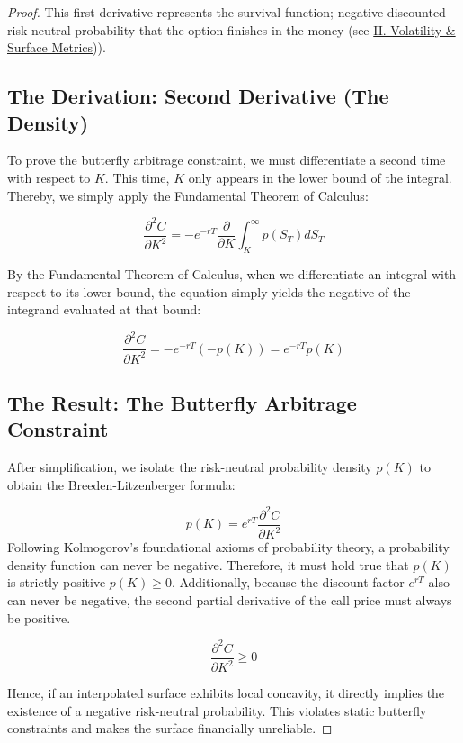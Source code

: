 \documentclass[12pt,oneside]{report}
\theoremstyle{definition}
\theoremstyle{remark}
\begin{document}
\begin{proof}
This first derivative represents the survival function; negative discounted risk-neutral probability that the option finishes in the money (see \hyperref[sec:glossary_volatility_surface_metrics]{II. Volatility \& Surface Metrics})).

\subsection{The Derivation: Second Derivative (The Density)}

To prove the butterfly arbitrage constraint, we must differentiate a second time with respect to $K$. This time, $K$ only appears in the lower bound of the integral. Thereby, we simply apply the Fundamental Theorem of Calculus:

$$\frac{\partial^2 C}{\partial K^2} = -e^{-rT} \frac{\partial}{\partial K} \int_{K}^{\infty} p(S_T) dS_T$$

By the Fundamental Theorem of Calculus, when we differentiate an integral with respect to its lower bound, the equation simply yields the negative of the integrand evaluated at that bound:

\begin{equation}
\frac{\partial^2 C}{\partial K^2} = -e^{-rT} \left( -p(K) \right) = e^{-rT} p(K)
\label{eq:initial_b_l_result}
\end{equation}
\subsection{The Result: The Butterfly Arbitrage Constraint}

After simplification, we isolate the risk-neutral probability density $p(K)$ to obtain the Breeden-Litzenberger formula:

\begin{equation}
p(K) = e^{rT} \frac{\partial^2 C}{\partial K^2}
\label{eq:rearanged_b_l_result}
\end{equation}
Following Kolmogorov's foundational axioms of probability theory, a probability density function can never be negative. Therefore, it must hold true that $p(K)$ is strictly positive $p(K) \ge 0$. Additionally, because the discount factor $e^{rT}$ also can never be negative, the second partial derivative of the call price must always be positive. 

$$\frac{\partial^2 C}{\partial K^2} \ge 0$$

Hence, if an interpolated surface exhibits local concavity, it directly implies the existence of a negative risk-neutral probability. This violates static butterfly constraints and makes the surface financially unreliable.

\end{proof}
\newpage
\end{document}
